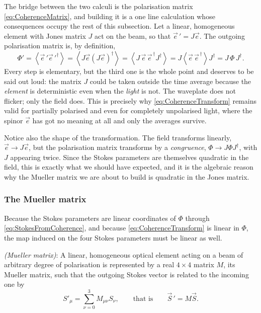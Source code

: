             The bridge between the two calculi is the polarisation matrix \ref{eq:CoherenceMatrix}, and building it is a one line calculation whose consequences occupy the rest of this subsection. Let a linear, homogeneous element with Jones matrix $J$ act on the beam, so that $\vec{e}\,'=J\vec{e}$. The outgoing polarisation matrix is, by definition,
            \begin{equation}\label{eq:CoherenceTransform}
                \Phi' = \left\langle\vec{e}\,'\vec{e}\,'^{\dagger}\right\rangle = \left\langle J\vec{e}\left(J\vec{e}\right)^{\dagger}\right\rangle = \left\langle J\,\vec{e}\,\vec{e}^{\,\dagger}J^{\dagger}\right\rangle = J\left\langle\vec{e}\,\vec{e}^{\,\dagger}\right\rangle J^{\dagger} = J\,\Phi\,J^{\dagger} .
            \end{equation}
            Every step is elementary, but the third one is the whole point and deserves to be said out loud: the matrix $J$ could be taken outside the time average because the \textit{element} is deterministic even when the \textit{light} is not. The waveplate does not flicker; only the field does. This is precisely why \ref{eq:CoherenceTransform} remains valid for partially polarised and even for completely unpolarised light, where the spinor $\vec{e}$ has got no meaning at all and only the averages survive.

            Notice also the shape of the transformation. The field transforms linearly, $\vec{e}\to J\vec{e}$, but the polarisation matrix transforms by a \emph{congruence}, $\Phi\to J\Phi J^\dagger$, with $J$ appearing twice. Since the Stokes parameters are themselves quadratic in the field, this is exactly what we should have expected, and it is the algebraic reason why the Mueller matrix we are about to build is quadratic in the Jones matrix.

        \subsubsection{The Mueller matrix}

            Because the Stokes parameters are linear coordinates of $\Phi$ through \ref{eq:StokesFromCoherence}, and because \ref{eq:CoherenceTransform} is linear in $\Phi$, the map induced on the four Stokes parameters must be linear as well.

            \begin{myDef}
                \textit{(Mueller matrix)}: A linear, homogeneous optical element acting on a beam of arbitrary degree of polarisation is represented by a real $4\times4$ matrix $M$, its Mueller matrix, such that the outgoing Stokes vector is related to the incoming one by
                \begin{equation}\label{eq:MuellerAction}
                    S'_\mu = \sum_{\nu=0}^{3}M_{\mu\nu}S_\nu , \qquad \text{that is} \qquad \vec{S}\,' = M\vec{S} .
                \end{equation}
            \end{myDef}

